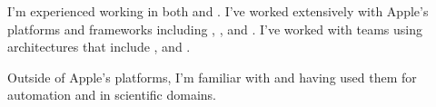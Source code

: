 I'm experienced working in both  and .
%
I've worked extensively with Apple's platforms and frameworks including
, ,  and .
%
I've worked with teams using architectures that include ,
 and .

\smallskip

Outside of Apple's platforms, I'm familiar with  and 
having used them for automation and in scientific domains.


